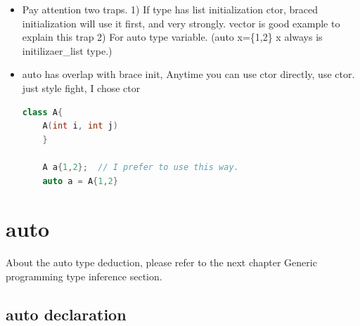 \documentclass[a4paper,12pt,twoside]{book}
\begin{document}
\begin{itemize}
	\item Pay attention two traps. 1) If type has list initialization ctor, braced initialization will use it first, and very strongly. vector is good example to explain this trap  2) For auto type variable. (auto x=\{1,2\} x always is initilizaer\_list type.)
	

	\item auto has overlap with brace init, Anytime you can use ctor directly, use ctor. just style fight, I chose ctor
	\begin{lstlisting}[frame=single, language=c++]
	class A{
	A(int i, int j)
	}
	
	A a{1,2};  // I prefer to use this way. 
	auto a = A{1,2}
	\end{lstlisting}
	
\end{itemize}


\section{auto}

About the auto type deduction, please refer to the next chapter Generic programming type inference section.

\subsection{auto declaration}
\end{document}
